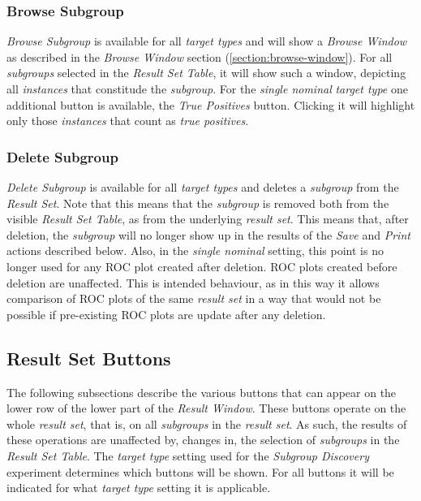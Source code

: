 \documentclass{article}
\begin{document}
\subsubsection{Browse Subgroup}
\label{result-window:browse}
\emph{Browse Subgroup} is available for all \emph{target types} and will show a \emph{Browse Window} as described in the \emph{Browse Window} section (\ref{section:browse-window}).
For all \emph{subgroups} selected in the \emph{Result Set Table}, it will show such a window, depicting all \emph{instances} that constitude the \emph{subgroup}.
For the \emph{single nominal} \emph{target type} one additional button is available, the \emph{True Positives} button.
Clicking it will highlight only those \emph{instances} that count as \emph{true positives}.



\subsubsection{Delete Subgroup}
\label{result-window:delete}
\emph{Delete Subgroup} is available for all \emph{target types} and deletes a \emph{subgroup} from the \emph{Result Set}.
Note that this means that the \emph{subgroup} is removed both from the visible \emph{Result Set Table}, as from the underlying \emph{result set}.
This means that, after deletion, the \emph{subgroup} will no longer show up in the results of the \emph{Save} and \emph{Print} actions described below.
Also, in the \emph{single nominal} setting, this point is no longer used for any ROC plot created after deletion.
ROC plots created before deletion are unaffected.
This is intended behaviour, as in this way it allows comparison of ROC plots of the same \emph{result set} in a way that would not be possible if pre-existing ROC plots are update after any deletion.



\subsection{Result Set Buttons}
\label{result-window:result-set-buttons}
The following subsections describe the various buttons that can appear on the lower row of the lower part of the \emph{Result Window}.
These buttons operate on the whole \emph{result set}, that is, on all \emph{subgroups} in the \emph{result set}.
As such, the results of these operations are unaffected by, changes in, the selection of \emph{subgroups} in the \emph{Result Set Table}.
The \emph{target type} setting used for the \emph{Subgroup Discovery} experiment determines which buttons will be shown.
For all buttons it will be indicated for what \emph{target type} setting it is applicable.
\end{document}
